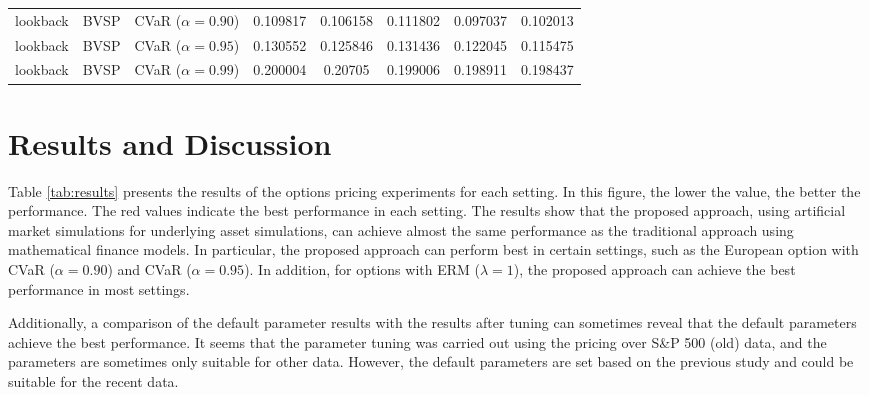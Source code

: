 \begin{table*}[htb]
\begin{tabular}{ccc|cc|ccc}
        lookback                      & BVSP                         & CVaR ($\alpha=0.90$)             & 0.109817            & 0.106158            & 0.111802                     & \color{red}0.097037 & 0.102013            \\
        lookback                      & BVSP                         & CVaR ($\alpha=0.95$)             & 0.130552            & 0.125846            & 0.131436                     & 0.122045            & \color{red}0.115475 \\
        lookback                      & BVSP                         & CVaR ($\alpha=0.99$)             & 0.200004            & 0.20705             & 0.199006                     & 0.198911            & \color{red}0.198437 \\\hline
    \end{tabular}
\end{table*}

\section{Results and Discussion}
Table \ref{tab:results} presents the results of the options pricing experiments for each setting.
In this figure, the lower the value, the better the performance.
The red values indicate the best performance in each setting.
The results show that the proposed approach, using artificial market simulations for underlying asset simulations, can achieve almost the same performance as the traditional approach using mathematical finance models.
In particular, the proposed approach can perform best in certain settings, such as the European option with CVaR ($\alpha=0.90$) and CVaR ($\alpha=0.95$).
In addition, for options with ERM ($\lambda=1$), the proposed approach can achieve the best performance in most settings.

Additionally, a comparison of the default parameter results with the results after tuning can sometimes reveal that the default parameters achieve the best performance.
It seems that the parameter tuning was carried out using the pricing over S\&P 500 (old) data, and the parameters are sometimes only suitable for other data.
However, the default parameters are set based on the previous study and could be suitable for the recent data.

